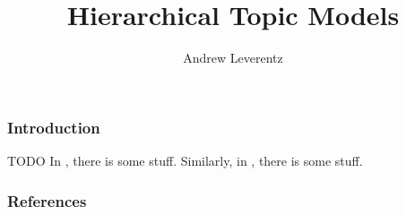 \documentclass{beamer}
\title{Hierarchical Topic Models}
\author{Andrew Leverentz}
\date{}
\begin{document}
\begin{frame}
\titlepage
\end{frame}

\begin{frame}
\frametitle{Introduction}
TODO
In \cite{paisley2015nhdp}, there is some stuff.
Similarly, in \cite{blei2010ncrp}, there is some stuff.
\end{frame}


{
\begin{frame}[allowframebreaks]
\frametitle{References}
\nocite{*}
%
%


\end{frame}
}
\end{document}
